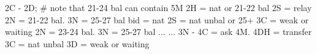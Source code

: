 2C - 2D;
# note that 21-24 bal can contain 5M
2H = nat or 21-22 bal
    2S = relay
        2N = 21-22 bal. 3N = 25-27 bal
        bid = nat
2S = nat unbal or 25+
    3C = weak or waiting
2N = 23-24 bal. 3N = 25-27 bal ...
    ... 3N - 4C = ask 4M. 4DH = transfer
3C = nat unbal
    3D = weak or waiting
